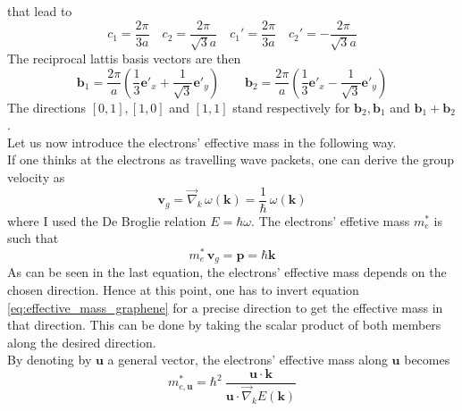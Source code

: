 \documentclass{article}
\newcommand{\ve}[1]{\mathbf{#1}}
\begin{document}
that lead to 
\begin{equation*}
    c_1 = \frac{2\pi}{3a} \quad c_2 = \frac{2\pi}{\sqrt{3}a} \quad c_1' = \frac{2\pi}{3a} \quad c_2' = -\frac{2\pi}{\sqrt{3}a}
\end{equation*}
The reciprocal lattis basis vectors are then 
\begin{equation*}
    \ve b_{1}=\frac{2 \pi}{a}\left(\frac{1}{3} \ve e'_x +\frac{1}{\sqrt{3}} \ve e'_y\right) \qquad \ve b_{2}=\frac{2 \pi}{a}\left(\frac{1}{3} \ve e'_x -\frac{1}{\sqrt{3}} \ve e'_y \right)
\end{equation*}
The directions $[0,1], [1,0]$ and $[1,1]$ stand respectively for $\ve b_2, \ve b_1$ and $\ve b_1 + \ve b_2$. \\
Let us now introduce the electrons' effective mass in the following way. \\
If one thinks at the electrons as travelling wave packets, one can derive the group velocity as 
\begin{equation*}
    \ve v_g = \vec\nabla_k \, \omega(\ve k) = \frac{1}{\hbar} \, \omega(\ve k)
\end{equation*}
where I used the De Broglie relation $E = \hbar \omega$. The electrons' effetive mass $m_e^*$ is such that 
\begin{equation}
    m_e^* \, \ve v_g = \ve p = \hbar \ve k
    \label{eq:effective_mass_graphene}
\end{equation}
As can be seen in the last equation, the electrons' effective mass depends on the chosen direction. Hence at this point, one has to invert 
equation \ref{eq:effective_mass_graphene} for a precise direction to get the effective mass in that direction. This can be done by taking the scalar product of both members along the desired direction. \\
By denoting by $\ve u$ a general vector, the electrons' effective mass along $\ve u$ becomes
\begin{equation}
    m_{e, \ve u}^{*}=\hbar^{2} \ \frac{\ve u \cdot \ve k}{\ve u \cdot \vec\nabla_{k} E(\ve{k})}
    \label{eq:effective_mass_der1}
\end{equation}
\end{document}
